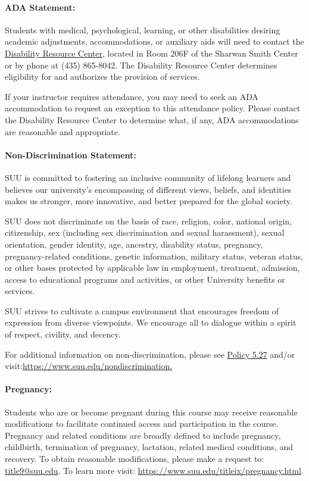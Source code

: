\documentclass[12pt, letterpaper]{article}
\begin{document}
\paragraph{ADA Statement:}
Students with medical, psychological, learning, or other disabilities desiring academic adjustments, accommodations, or auxiliary aids will need to contact the \href{https://www.suu.edu/disabilityservices/}{Disability Resource Center}, located in Room 206F of the Sharwan Smith Center or by phone at (435) 865-8042. The Disability Resource Center determines eligibility for and authorizes the provision of services.

\noindent
If your instructor requires attendance, you may need to seek an ADA accommodation to request an exception to this attendance policy. Please contact the Disability Resource Center to determine what, if any, ADA accommodations are reasonable and appropriate.

\paragraph{Non-Discrimination Statement:}
SUU is committed to fostering an inclusive community of lifelong learners and believes our university's encompassing of different views, beliefs, and identities makes us stronger, more innovative, and better prepared for the global society.

\noindent
SUU does not discriminate on the basis of race, religion, color, national origin, citizenship, sex (including sex discrimination and sexual harassment), sexual orientation, gender identity, age, ancestry, disability status, pregnancy, pregnancy-related conditions, genetic information, military status, veteran status, or other bases protected by applicable law in employment, treatment, admission, access to educational programs and activities, or other University benefits or services.

\noindent
SUU strives to cultivate a campus environment that encourages freedom of expression from diverse viewpoints. We encourage all to dialogue within a spirit of respect, civility, and decency.

\noindent
For additional information on non-discrimination, please see \href{https://www.suu.edu/policies/05/27.html}{Policy 5.27} and/or visit:\newline \href{https://www.suu.edu/nondiscrimination.}{https://www.suu.edu/nondiscrimination.}

\paragraph{Pregnancy:}
Students who are or become pregnant during this course may receive reasonable modifications to facilitate continued access and participation in the course. Pregnancy and related conditions are broadly defined to include pregnancy, childbirth, termination of pregnancy, lactation, related medical conditions, and recovery. To obtain reasonable modifications, please make a request to: \href{mailto:title9@suu.edu}{title9@suu.edu}. To learn more visit: \href{https://www.suu.edu/titleix/pregnancy.html}{https://www.suu.edu/titleix/pregnancy.html}.
\end{document}
